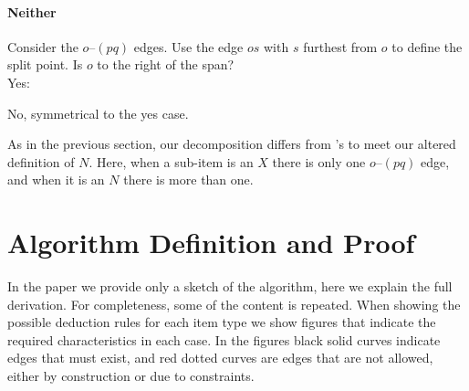 \paragraph{Neither}
Consider the $o$--$(pq)$ edges.
Use the edge $os$ with $s$ furthest from $o$ to define the split point.
Is $o$ to the right of the span? \\
Yes: \\
\begin{center}
\end{center}

\noindent
No, symmetrical to the yes case.

As in the previous section, our decomposition differs from \textcite{ec}'s to meet our altered definition of $N$.
Here, when a sub-item is an $X$ there is only one $o$--$(pq)$ edge, and when it is an $N$ there is more than one.


\section{Algorithm Definition and Proof}

In the paper we provide only a sketch of the algorithm, here we explain the full derivation.
For completeness, some of the content is repeated.
When showing the possible deduction rules for each item type we show figures that indicate the required characteristics in each case.
In the figures black solid curves indicate edges that must exist, and red dotted curves are edges that are not allowed, either by construction or due to constraints.

